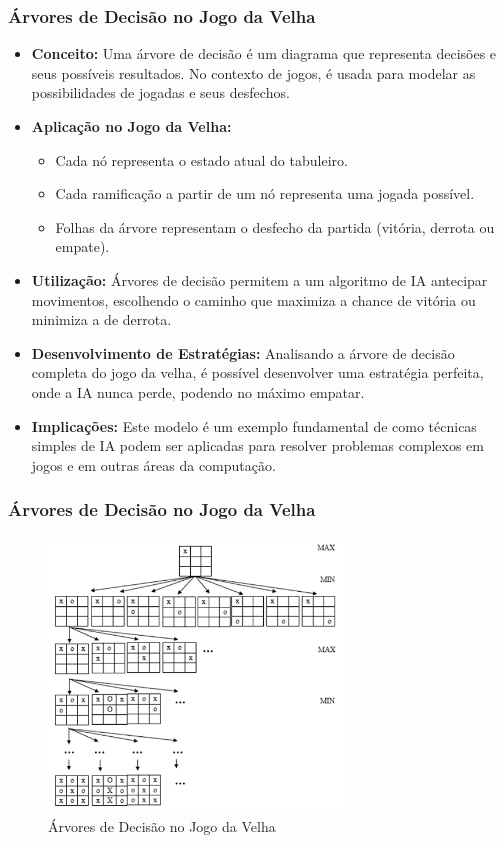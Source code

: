 \begin{frame}[fragile]
  \frametitle{Árvores de Decisão no Jogo da Velha}
  \begin{itemize}
    \item \textbf{Conceito:} Uma árvore de decisão é um diagrama que representa decisões e seus possíveis resultados. No contexto de jogos, é usada para modelar as possibilidades de jogadas e seus desfechos.
    \item \textbf{Aplicação no Jogo da Velha:}
      \begin{itemize}
        \item Cada nó representa o estado atual do tabuleiro.
        \item Cada ramificação a partir de um nó representa uma jogada possível.
        \item Folhas da árvore representam o desfecho da partida (vitória, derrota ou empate).
      \end{itemize}
    \item \textbf{Utilização:} Árvores de decisão permitem a um algoritmo de IA antecipar movimentos, escolhendo o caminho que maximiza a chance de vitória ou minimiza a de derrota.
    \item \textbf{Desenvolvimento de Estratégias:} Analisando a árvore de decisão completa do jogo da velha, é possível desenvolver uma estratégia perfeita, onde a IA nunca perde, podendo no máximo empatar.
    \item \textbf{Implicações:} Este modelo é um exemplo fundamental de como técnicas simples de IA podem ser aplicadas para resolver problemas complexos em jogos e em outras áreas da computação.
  \end{itemize}
\end{frame}
\begin{frame}[fragile]
  \frametitle{Árvores de Decisão no Jogo da Velha}
  \begin{figure}
    \centering
    \includegraphics[width=0.7\textwidth]{assets/aula5-tic.png}
    \caption{Árvores de Decisão no Jogo da Velha}
  \end{figure}
\end{frame}


